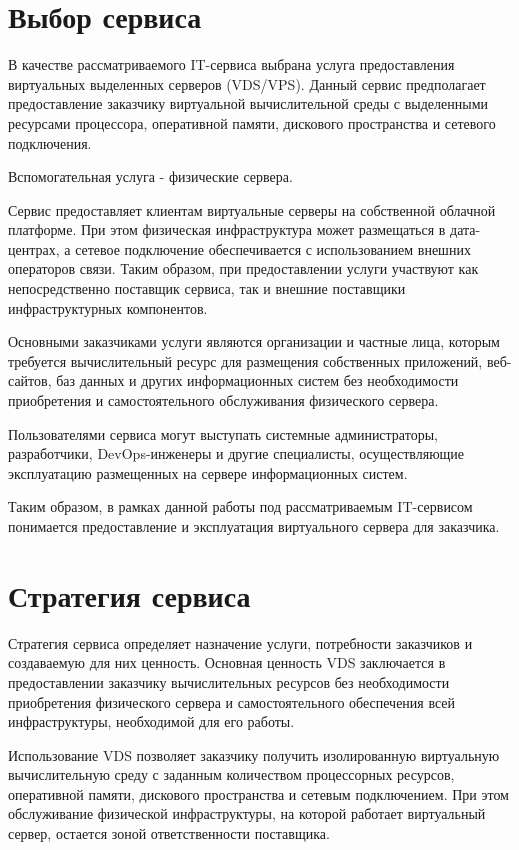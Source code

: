 \documentclass[14pt,a4paper]{extarticle}
\begin{document}
\section{Выбор сервиса}

В качестве рассматриваемого IT-сервиса выбрана услуга предоставления
виртуальных выделенных серверов (VDS/VPS). Данный сервис предполагает
предоставление заказчику виртуальной вычислительной среды с выделенными
ресурсами процессора, оперативной памяти, дискового пространства и сетевого
подключения.

Вспомогательная услуга - физические сервера.

Сервис предоставляет клиентам виртуальные серверы на собственной облачной
платформе. При этом физическая инфраструктура может размещаться в дата-центрах,
а сетевое подключение обеспечивается с использованием внешних операторов связи.
Таким образом, при предоставлении услуги участвуют как непосредственно
поставщик сервиса, так и внешние поставщики инфраструктурных компонентов.

Основными заказчиками услуги являются организации и частные лица, которым
требуется вычислительный ресурс для размещения собственных приложений,
веб-сайтов, баз данных и других информационных систем без необходимости
приобретения и самостоятельного обслуживания физического сервера.

Пользователями сервиса могут выступать системные администраторы, разработчики,
DevOps-инженеры и другие специалисты, осуществляющие эксплуатацию размещенных
на сервере информационных систем.

Таким образом, в рамках данной работы под рассматриваемым IT-сервисом
понимается предоставление и эксплуатация виртуального сервера для заказчика.

\section{Стратегия сервиса}

Стратегия сервиса определяет назначение услуги, потребности заказчиков и
создаваемую для них ценность. Основная ценность VDS заключается в
предоставлении заказчику вычислительных ресурсов без необходимости приобретения
физического сервера и самостоятельного обеспечения всей инфраструктуры,
необходимой для его работы.

Использование VDS позволяет заказчику получить изолированную виртуальную
вычислительную среду с заданным количеством процессорных ресурсов, оперативной
памяти, дискового пространства и сетевым подключением. При этом обслуживание
физической инфраструктуры, на которой работает виртуальный сервер, остается
зоной ответственности поставщика.
\end{document}
